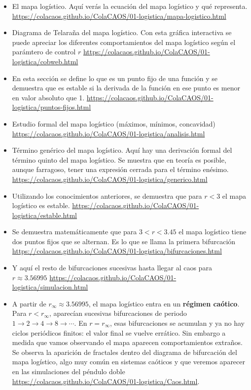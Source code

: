 \documentclass[
  10pt,
  a4paper,
  DIV=11,
  numbers=noendperiod,
  open=any]{scrreprt}
\numberwithin{equation}{chapter}
\numberwithin{equation}{section}
\renewcommand{\[}{\begin{equation}}
\renewcommand{\]}{\end{equation}}
\begin{document}
\begin{itemize}
\item
  El mapa logístico. Aquí verás la ecuación del mapa logístico y qué representa.
  \url{https://colacaos.github.io/ColaCAOS/01-logistica/mapa-logistico.html}
\item
  Diagrama de Telaraña del mapa logístico. Con esta gráfica interactiva se puede apreciar los diferentes comportamientos del mapa logístico según el parámtero de control $r$
  \url{https://colacaos.github.io/ColaCAOS/01-logistica/cobweb.html}
\item
  En esta sección se define lo que es un punto fijo de una función y se demuestra que es estable si la derivada de la función en ese punto es menor en valor absoluto que 1. 
  \url{https://colacaos.github.io/ColaCAOS/01-logistica/puntos-fijos.html}
\item
  Estudio formal del mapa logístico (máximos, mínimos, concavidad)
  \url{https://colacaos.github.io/ColaCAOS/01-logistica/analisis.html}
\item
  Término genérico del mapa logístico. Aquí hay una derivación formal del término quinto del mapa logístico. Se muestra que en teoría es posible, aunque farragoso, tener una expresión cerrada para el término enésimo. 
  \url{https://colacaos.github.io/ColaCAOS/01-logistica/generico.html}
\item
  Utilizando los conocimientos anteriores, se demuestra que para $r < 3$ el mapa logístico es estable. 
  \url{https://colacaos.github.io/ColaCAOS/01-logistica/estable.html}
\item
  Se demuestra matemáticamente que para  $3 < r < 3.45$ el mapa logístico tiene dos puntos fijos que se alternan. Es lo que se llama la primera bifurcación
  \url{https://colacaos.github.io/ColaCAOS/01-logistica/bifurcaciones.html} 
\item
  Y aquí el resto de bifurcaciones sucesivas hasta llegar al caos para $r \approx 3.56995$  
  \url{https://colacaos.github.io/ColaCAOS/01-logistica/simulacion.html} 

 \item
    A partir de \(r_\infty \approx 3.56995\), el mapa logístico entra en un
\textbf{régimen caótico}. Para \(r < r_\infty\), aparecían sucesivas
bifurcaciones de periodo \(1 \to 2 \to 4 \to 8 \to \cdots\). En
\(r = r_\infty\), esas bifurcaciones se acumulan y ya no hay ciclos
periódicos finitos: el valor final se vuelve errático. Sin embargo a
medida que vamos observando el mapa aparecen comportamientos extraños. Se observa la aparición de fractales dentro del diagrama de bifurcación del mapa logístico, algo muy común en sistemas caóticos y que veremos aparecer en las simulaciones del péndulo doble \url{https://colacaos.github.io/ColaCAOS/01-logistica/Caos.html}. 

\end{itemize}
\end{document}

